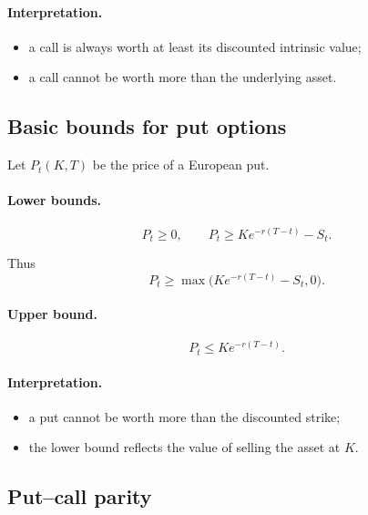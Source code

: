 \documentclass[11pt]{article}
\newcommand{\1}{\mathbf{1}}
\theoremstyle{plain}
\theoremstyle{definition}
\theoremstyle{remark}
\begin{document}
\medskip

\paragraph{Interpretation.}
\begin{itemize}[leftmargin=1.4em]
\item a call is always worth at least its discounted intrinsic value;
\item a call cannot be worth more than the underlying asset.
\end{itemize}

\subsection{Basic bounds for put options}

Let \(P_t(K,T)\) be the price of a European put.

\paragraph{Lower bounds.}
\[
P_t \ge 0,
\qquad
P_t \ge K e^{-r(T-t)} - S_t.
\]

Thus
\[
\boxed{
P_t \ge \max\!\big(K e^{-r(T-t)}-S_t,0\big).
}
\]

\paragraph{Upper bound.}
\[
\boxed{
P_t \le K e^{-r(T-t)}.
}
\]

\medskip

\paragraph{Interpretation.}
\begin{itemize}[leftmargin=1.4em]
\item a put cannot be worth more than the discounted strike;
\item the lower bound reflects the value of selling the asset at \(K\).
\end{itemize}

\subsection{Put--call parity}
\end{document}
